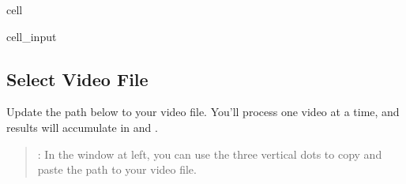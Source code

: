 \documentclass[letterpaper,10pt,english]{jupyterBook}
\begin{document}
\begin{sphinxuseclass}{cell}\begin{sphinxVerbatimInput}

\begin{sphinxuseclass}{cell_input}
\begin{sphinxVerbatim}[commandchars=\\\{\}]
 
\end{sphinxVerbatim}

\end{sphinxuseclass}\end{sphinxVerbatimInput}

\end{sphinxuseclass}

\subsection{Select Video File}
\label{\detokenize{FlyTracking/ColabNotebook:select-video-file}}
\sphinxAtStartPar
Update the path below to your video file. You’ll process one video at a time, and results will accumulate in  and .
\begin{quote}

\sphinxAtStartPar
{}: In the window at left, you can use the three vertical dots to copy and paste the path to your video file.
\end{quote}
\end{document}
